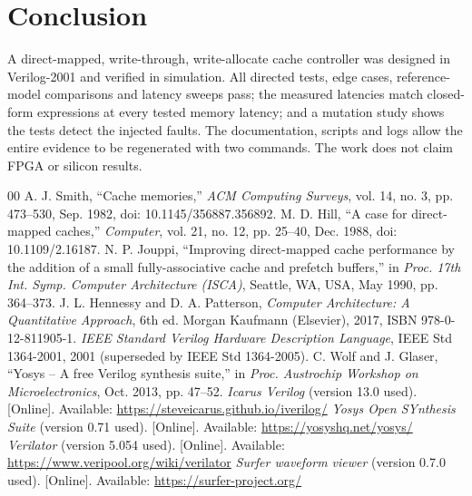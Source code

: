 \documentclass[conference]{IEEEtran}
\begin{document}
\section{Conclusion}
A direct-mapped, write-through, write-allocate cache controller was designed in Verilog-2001 and verified in simulation. All directed tests, edge cases, \nRefTxns{} reference-model comparisons and latency sweeps pass; the measured latencies match closed-form expressions at every tested memory latency; and a mutation study shows the tests detect the injected faults. The documentation, scripts and logs allow the entire evidence to be regenerated with two commands. The work does not claim FPGA or silicon results.

\begin{thebibliography}{00}
 A. J. Smith, ``Cache memories,'' \emph{ACM Computing Surveys}, vol. 14, no. 3, pp. 473--530, Sep. 1982, doi: 10.1145/356887.356892.
 M. D. Hill, ``A case for direct-mapped caches,'' \emph{Computer}, vol. 21, no. 12, pp. 25--40, Dec. 1988, doi: 10.1109/2.16187.
 N. P. Jouppi, ``Improving direct-mapped cache performance by the addition of a small fully-associative cache and prefetch buffers,'' in \emph{Proc. 17th Int. Symp. Computer Architecture (ISCA)}, Seattle, WA, USA, May 1990, pp. 364--373.
 J. L. Hennessy and D. A. Patterson, \emph{Computer Architecture: A Quantitative Approach}, 6th ed. Morgan Kaufmann (Elsevier), 2017, ISBN 978-0-12-811905-1.
 \emph{IEEE Standard Verilog Hardware Description Language}, IEEE Std 1364-2001, 2001 (superseded by IEEE Std 1364-2005).
 C. Wolf and J. Glaser, ``Yosys -- A free Verilog synthesis suite,'' in \emph{Proc. Austrochip Workshop on Microelectronics}, Oct. 2013, pp. 47--52.
 \emph{Icarus Verilog} (version 13.0 used). [Online]. Available: \url{https://steveicarus.github.io/iverilog/}
 \emph{Yosys Open SYnthesis Suite} (version 0.71 used). [Online]. Available: \url{https://yosyshq.net/yosys/}
 \emph{Verilator} (version 5.054 used). [Online]. Available: \url{https://www.veripool.org/wiki/verilator}
 \emph{Surfer waveform viewer} (version 0.7.0 used). [Online]. Available: \url{https://surfer-project.org/}
\end{thebibliography}
\end{document}
